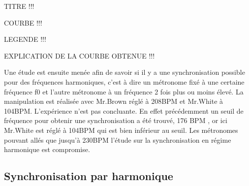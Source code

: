 \documentclass[a4paper,11pt]{report}
\begin{document}
					TITRE !!!
					
					COURBE !!!
					
					LEGENDE !!!
					
					EXPLICATION DE LA COURBE OBTENUE !!!
					
Une étude est ensuite menée afin de savoir si il y a une synchronisation possible pour des fréquences harmoniques, c'est à dire un métronome fixé à une certaine fréquence f0 et l'autre métronome à un fréquence 2 fois plus ou moins élevé. La manipulation est réalisée avec Mr.Brown réglé à 208BPM et Mr.White à 104BPM. L'expérience n'est pas concluante. En effet précédemment un seuil de fréquence pour obtenir une synchronisation a été trouvé, 176 BPM , or ici Mr.White est réglé à 104BPM qui est bien inférieur au seuil. Les métronomes pouvant allés que jusqu'à 230BPM l'étude sur la synchronisation en régime harmonique est compromise. 

\subsection{Synchronisation par harmonique}
\end{document}
